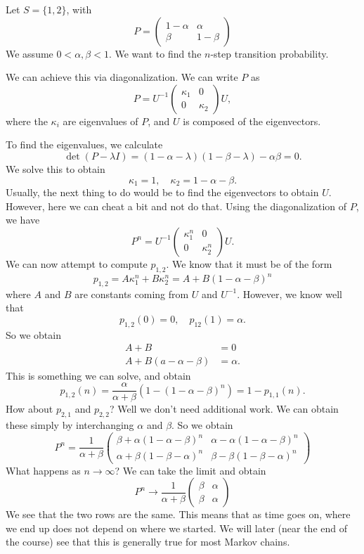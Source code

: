 \documentclass[a4paper]{article}
\begin{document}
\begin{eg}
  Let $S = \{1, 2\}$, with
  \[
    P =
    \begin{pmatrix}
      1 - \alpha & \alpha\\
      \beta & 1 - \beta
    \end{pmatrix}
  \]
  We assume $0 < \alpha, \beta < 1$. We want to find the $n$-step transition probability.

  We can achieve this via diagonalization. We can write $P$ as
  \[
    P = U^{-1}
    \begin{pmatrix}
      \kappa_1 & 0\\
      0 & \kappa_2
    \end{pmatrix}U,
  \]
  where the $\kappa_i$ are eigenvalues of $P$, and $U$ is composed of the eigenvectors.

  To find the eigenvalues, we calculate
  \[
    \det (P - \lambda I) = (1 - \alpha - \lambda)(1 - \beta - \lambda) - \alpha\beta = 0.
  \]
  We solve this to obtain
  \[
    \kappa_1 = 1,\quad \kappa_2 = 1 - \alpha - \beta.
  \]
  Usually, the next thing to do would be to find the eigenvectors to obtain $U$. However, here we can cheat a bit and not do that. Using the diagonalization of $P$, we have
  \[
    P^n = U^{-1}
    \begin{pmatrix}
      \kappa_1^n & 0\\
      0 & \kappa_2^n
    \end{pmatrix}U.
  \]
  We can now attempt to compute $p_{1, 2}$. We know that it must be of the form
  \[
    p_{1, 2} = A\kappa_1^n + B\kappa_2^n = A + B(1 - \alpha - \beta)^n
  \]
  where $A$ and $B$ are constants coming from $U$ and $U^{-1}$. However, we know well that
  \[
    p_{1, 2}(0) = 0,\quad p_{12}(1) = \alpha.
  \]
  So we obtain
  \begin{align*}
    A + B &= 0\\
    A + B(a - \alpha - \beta) &= \alpha.
  \end{align*}
  This is something we can solve, and obtain
  \[
    p_{1, 2}(n) = \frac{\alpha}{\alpha + \beta}(1 - (1 - \alpha - \beta)^n) = 1 - p_{1, 1}(n).
  \]
  How about $p_{2, 1}$ and $p_{2, 2}$? Well we don't need additional work. We can obtain these simply by interchanging $\alpha$ and $\beta$. So we obtain
  \[
    P^n = \frac{1}{\alpha + \beta}
    \begin{pmatrix}
      \beta + \alpha(1 - \alpha - \beta)^n & \alpha - \alpha(1 - \alpha - \beta)^n\\
      \alpha + \beta(1 - \beta - \alpha)^n & \beta - \beta(1 - \beta - \alpha)^n
    \end{pmatrix}
  \]
  What happens as $n\to \infty$? We can take the limit and obtain
  \[
    P^n \to \frac{1}{\alpha + \beta}
    \begin{pmatrix}
      \beta & \alpha\\
      \beta & \alpha
    \end{pmatrix}
  \]
  We see that the two rows are the same. This means that as time goes on, where we end up does not depend on where we started. We will later (near the end of the course) see that this is generally true for most Markov chains.


\end{eg}
\end{document}
